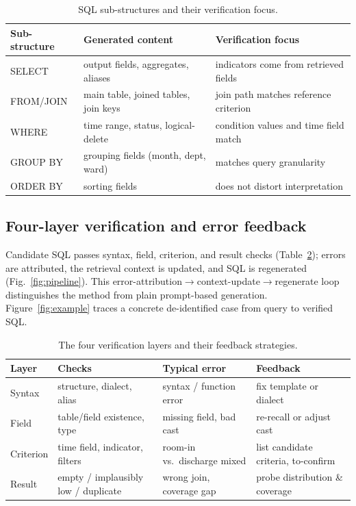 \documentclass[11pt]{article}
\begin{document}
\begin{table}[t]\centering
\caption{SQL sub-structures and their verification focus.}\label{tab:substruct}
\begin{tabular}{p{2.4cm}p{5.9cm}p{4.9cm}}
\toprule
Sub-structure & Generated content & Verification focus\\
\midrule
SELECT & output fields, aggregates, aliases & indicators come from retrieved fields\\
FROM/JOIN & main table, joined tables, join keys & join path matches reference criterion\\
WHERE & time range, status, logical-delete & condition values and time field match\\
GROUP BY & grouping fields (month, dept, ward) & matches query granularity\\
ORDER BY & sorting fields & does not distort interpretation\\
\bottomrule
\end{tabular}
\end{table}

\subsection{Four-layer verification and error feedback}
Candidate SQL passes syntax, field, criterion, and result checks (Table~\ref{tab:verify}); errors
are attributed, the retrieval context is updated, and SQL is regenerated (Fig.~\ref{fig:pipeline}).
This error-attribution$\rightarrow$context-update$\rightarrow$regenerate loop distinguishes the
method from plain prompt-based generation. Figure~\ref{fig:example} traces a concrete de-identified
case from query to verified SQL.

\begin{table}[t]\centering
\caption{The four verification layers and their feedback strategies.}\label{tab:verify}
\begin{tabular}{p{2.0cm}p{4.6cm}p{3.4cm}p{3.6cm}}
\toprule
Layer & Checks & Typical error & Feedback\\
\midrule
Syntax & structure, dialect, alias & syntax / function error & fix template or dialect\\
Field & table/field existence, type & missing field, bad cast & re-recall or adjust cast\\
Criterion & time field, indicator, filters & room-in vs.\ discharge mixed & list candidate criteria, to-confirm\\
Result & empty / implausibly low / duplicate & wrong join, coverage gap & probe distribution \& coverage\\
\bottomrule
\end{tabular}
\end{table}
\end{document}
